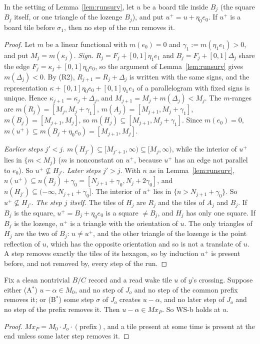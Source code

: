 \documentclass[11pt]{article}
\theoremstyle{definition}\newtheorem{definition}[theorem]{Definition}\newtheorem{remark}[theorem]{Remark}
\begin{document}
\begin{lemma}\label{lem:aneigh}
In the setting of Lemma~\ref{lem:runsurv}, let $u$ be a board tile inside $B_j$ (the square $B_j$ itself, or one triangle of the lozenge $B_j$), and put $u^+=u+\eta_0e_0$.
If $u^+$ is a board tile before $\sigma_1$, then no step of the run removes it.
\end{lemma}
\begin{proof}
Let $m$ be a linear functional with $m(e_0)=0$ and $\gamma_1:=m(\eta_1e_1)>0$, and put $M_j=m(\kappa_j)$.
\emph{Sign.} $R_j=F_j+[0,1]\eta_1e_1$ and $B_j=F_j+[0,1]\Delta_j$ share the edge $F_j=\kappa_j+[0,1]\eta_0e_0$, so the argument of Lemma~\ref{lem:runsurv} gives $m(\Delta_j)<0$.
By (R2), $R_{j+1}=R_j+\Delta_j$ is written with the same signs, and the representation $\kappa+[0,1]\eta_0e_0+[0,1]\eta_1e_1$ of a parallelogram with fixed signs is unique. Hence $\kappa_{j+1}=\kappa_j+\Delta_j$, and $M_{j+1}=M_j+m(\Delta_j)<M_j$.
The $m$-ranges are $m(R_j)=[M_j,M_j+\gamma_1]$, $m(A_j)=[M_{j+1},M_j+\gamma_1]$, $m(B_j)=[M_{j+1},M_j]$, so $m(H_j)\subseteq[M_{j+1},M_j+\gamma_1]$.
Since $m(e_0)=0$, $m(u^+)\subseteq m(B_j+\eta_0e_0)=[M_{j+1},M_j]$.

\emph{Earlier steps $j'<j$.} $m(H_{j'})\subseteq[M_{j'+1},\infty)\subseteq[M_j,\infty)$, while the interior of $u^+$ lies in $\{m<M_j\}$ ($m$ is nonconstant on $u^+$, because $u^+$ has an edge not parallel to $e_0$). So $u^+\not\subseteq H_{j'}$.
\emph{Later steps $j'>j$.} With $n$ as in Lemma~\ref{lem:runsurv}, $n(u^+)\subseteq n(B_j)+\gamma_0=[N_{j+1}+\gamma_0,N_j+2\gamma_0]$, and $n(H_{j'})\subseteq(-\infty,N_{j+1}+\gamma_0]$. The interior of $u^+$ lies in $\{n>N_{j+1}+\gamma_0\}$. So $u^+\not\subseteq H_{j'}$.
\emph{The step $j$ itself.} The tiles of $H_j$ are $R_j$ and the tiles of $A_j$ and $B_j$. If $B_j$ is the square, $u^+=B_j+\eta_0e_0$ is a square $\ne B_j$, and $H_j$ has only one square. If $B_j$ is the lozenge, $u^+$ is a triangle with the orientation of $u$. The only triangles of $H_j$ are the two of $B_j$: $u\ne u^+$, and the other triangle of the lozenge is the point reflection of $u$, which has the opposite orientation and so is not a translate of $u$.
A step removes exactly the tiles of its hexagon, so by induction $u^+$ is present before, and not removed by, every step of the run.
\end{proof}

\begin{proposition}\label{prop:wsb}
Fix a clean nontrivial $B/C$ record and a read wake tile $u$ of $y$'s crossing. Suppose either
(A$^*$) $u-\alpha\in M_0$, and no step of $J_o$ and no step of the common prefix removes it; or
(B$^*$) some step $\sigma$ of $J_o$ creates $u-\alpha$, and no later step of $J_o$ and no step of the prefix removes it.
Then $u-\alpha\in Mx_P$. So WS-b holds at $u$.
\end{proposition}
\begin{proof}
$Mx_P=M_0\cdot J_o\cdot(\text{prefix})$, and a tile present at some time is present at the end unless some later step removes it.
\end{proof}
\end{document}
